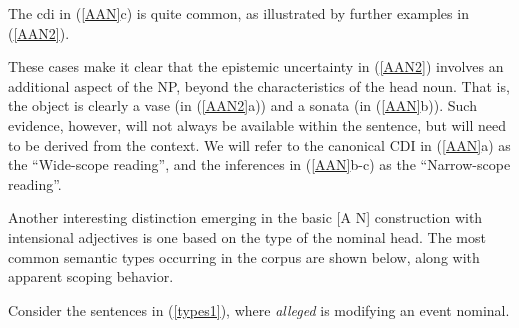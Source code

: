 \documentclass[10pt]{article}
\begin{document}
\noindent 
The {\sc cdi} in (\ref{AAN}c) is quite common, as illustrated by further examples in (\ref{AAN2}). 
\vspace{-0.5em}


\vspace{-0.5em}

\noindent These cases make it clear that the epistemic uncertainty in (\ref{AAN2}) involves an additional aspect of the NP,  beyond the  characteristics of the  head noun. That is, the object is clearly a vase (in (\ref{AAN2}a)) and  a sonata (in (\ref{AAN}b)). Such evidence, however, will not always be available within the  sentence, but will need to be derived from the context.  We will refer to the canonical {\sc CDI} in (\ref{AAN}a) as the ``Wide-scope reading'', and the inferences in 
(\ref{AAN}b-c) as the ``Narrow-scope reading''. 

Another interesting distinction emerging in the basic [A N] construction with intensional adjectives is  one based on the   type of the nominal  head. 
The most common semantic types occurring in the corpus are shown below, along with apparent scoping behavior. 

\vspace{-0.5em}
\vspace{-0.5em}

Consider the sentences in (\ref{types1}), where {\it alleged} is modifying an event nominal. 

\vspace{-0.5em}
\vspace{-0.5em}
\end{document}
